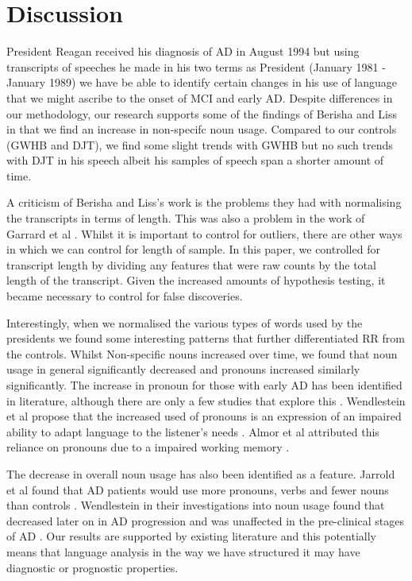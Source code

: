 \documentclass[12pt]{article}
\begin{document}
\section{Discussion}\label{discussion}
President Reagan received his diagnosis of AD in August 1994 but using transcripts of speeches he made in his two terms as President (January 1981 - January 1989) we have be able to identify certain changes in his use of language that we might ascribe to the onset of MCI and early AD. Despite differences in our methodology, our research supports some of the findings of Berisha and Liss in that we find an increase in non-specifc noun usage. Compared to our controls (GWHB and DJT), we find some slight trends with GWHB but no such trends with DJT in his speech albeit his samples of speech span a shorter amount of time.
\par 
A criticism of Berisha and Liss's work is the problems they had with normalising the transcripts in terms of length. This was also a problem in the work of Garrard et al \cite{Garrard2005, Le2011}. Whilst it is important to control for outliers, there are other ways in which we can control for length of sample. In this paper, we controlled for transcript length by dividing any features that were raw counts by the total length of the transcript. Given the increased amounts of hypothesis testing, it became necessary to control for false discoveries. 
\par 
Interestingly, when we normalised the various types of words used by the presidents we found some interesting patterns that further differentiated RR from the controls. Whilst Non-specific nouns increased over time, we found that noun usage in general significantly decreased and pronouns increased similarly significantly. The increase in pronoun for those with early AD has been identified in literature, although there are only a few studies that explore this \cite{Almor1999, Wendelstein2015}. Wendlestein et al propose that the increased used of pronouns is an expression of an impaired ability to adapt language to the listener's needs \cite{Wendelstein2015}. Almor et al attributed this reliance on pronouns due to a impaired working memory \cite{Almor1999}.
\par 
The decrease in overall noun usage has also been identified as a feature. Jarrold et al found that AD patients would use more pronouns, verbs and fewer nouns than controls \cite{Jarrold2014}. Wendlestein in their investigations into noun usage found that decreased later on in AD progression and was unaffected in the pre-clinical stages of AD \cite{Wendelstein2014}. Our results are supported by existing literature and this potentially means that language analysis in the way we have structured it may have diagnostic or prognostic properties.
\end{document}
